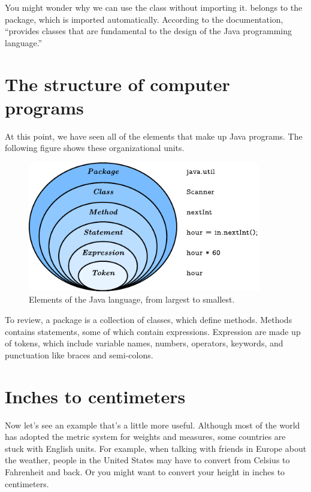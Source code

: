You might wonder why we can use the  class without importing
it.   belongs to the  package, which is
imported automatically.
According to the documentation,  ``provides classes that are fundamental to the design of the Java programming language.''


\section{The structure of computer programs}

At this point, we have seen all of the elements that make up Java programs.
The following figure shows these organizational units.

\begin{figure}[!h]
\includegraphics[width=4in]{package.pdf}
\caption{Elements of the Java language, from largest to smallest.}
\end{figure}

To review, a package is a collection of classes, which define methods.
Methods contains statements, some of which contain expressions.  Expression
are made up of tokens, which include variable names, numbers, operators,
keywords, and punctuation like braces and semi-colons.




\section{Inches to centimeters}

Now let's see an example that's a little more useful.
Although most of the world has adopted the metric system for weights and measures, some countries are stuck with English units.
For example, when talking with friends in Europe about the weather, people in the United States may have to convert from Celsius to Fahrenheit and back.
Or you might want to convert your height in inches to centimeters.

